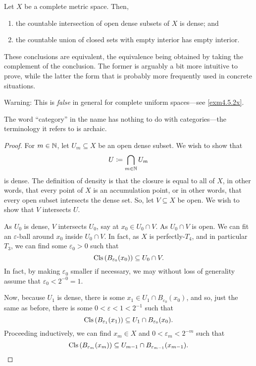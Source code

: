 \begin{thm}\label{BaireCategoryTheorem}
Let $X$ be a complete metric space.  Then,
\begin{enumerate}
\item the countable intersection of open dense subsets of $X$ is dense; and
\item the countable union of closed sets with empty interior has empty interior.
\end{enumerate}
\begin{rmk}
These conclusions are equivalent, the equivalence being obtained by taking the complement of the conclusion.  The former is arguably a bit more intuitive to prove, while the latter the form that is probably more frequently used in concrete situations.
\end{rmk}
\begin{rmk}
Warning:  This is \emph{false} in general for complete uniform spaces---see \cref{exm4.5.2x}.
\end{rmk}
\begin{rmk}
The word ``category'' in the name has nothing to do with categories---the terminology it refers to is archaic.
\end{rmk}
\begin{proof}
For $m\in \mathbb{N}$, let $U_m\subseteq X$ be an open dense subset.  We wish to show that
\begin{equation}
U\coloneqq \bigcap _{m\in \mathbb{N}}U_m
\end{equation}
is dense.  The definition of density is that the closure is equal to all of $X$, in other words, that every point of $X$ is an accumulation point, or in other words, that every open subset intersects the dense set.  So, let $V\subseteq X$ be open.  We wish to show that $V$ intersects $U$.

As $U_0$ is dense, $V$ intersects $U_0$, say at $x_0\in U_0\cap V$.  As $U_0\cap V$ is open.  We can fit an $\varepsilon$-ball around $x_0$ inside $U_0\cap V$.  In fact, as $X$ is perfectly-$T_4$, and in particular $T_3$, we can find some $\varepsilon _0>0$ such that
\begin{equation}
\operatorname{Cls} \left( B_{\varepsilon _0}(x_0)\right) \subseteq U_0\cap V.
\end{equation}
In fact, by making $\varepsilon _0$ smaller if necessary, we may without loss of generality assume that $\varepsilon _0<2^{-0}=1$.

Now, because $U_1$ is dense, there is some $x_1\in U_1\cap B_{\varepsilon _0}(x_0)$, and so, just the same as before, there is some $0<\varepsilon <1<2^{-1}$ such that
\begin{equation}
\operatorname{Cls} \left( B_{\varepsilon _1}(x_1)\right) \subseteq U_1\cap B_{\varepsilon _0}(x_0).
\end{equation}
Proceeding inductively, we can find $x_m\in X$ and $0<\varepsilon _m<2^{-m}$ such that
\begin{equation}
\operatorname{Cls} \left( B_{\varepsilon _m}(x_m)\right) \subseteq U_{m-1}\cap B_{\varepsilon _{m-1}}(x_{m-1}).
\end{equation}


\end{proof}
\end{thm}
